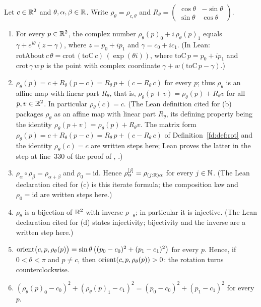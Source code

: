 \begin{lemma}\label{fd:lem:rot}\sloppy
Let $c\in\mathbb R^2$ and $\theta,\alpha,\beta\in\mathbb R$. Write $\rho_\theta=\rho_{c,\theta}$ and
$R_\theta=\begin{pmatrix}\cos\theta&-\sin\theta\\ \sin\theta&\cos\theta\end{pmatrix}$.
\begin{enumerate}[label=(\alph*)]
\item For every $p\in\mathbb R^2$, the complex number $\rho_\theta(p)_0+i\,\rho_\theta(p)_1$ equals
  $\gamma+e^{i\theta}(z-\gamma)$, where $z=p_0+ip_1$ and $\gamma=c_0+ic_1$. (In Lean:
  $\mathrm{rotAbout}\,c\,\theta=\mathrm{crot}\,(\mathrm{toC}\,c)\,(\exp(\theta i))$, where
  $\mathrm{toC}\,p=p_0+ip_1$ and $\mathrm{crot}\,\gamma\,w\,p$ is the point with complex coordinate
  $\gamma+w(\mathrm{toC}\,p-\gamma)$.)
\item $\rho_\theta(p)=c+R_\theta(p-c)=R_\theta\,p+(c-R_\theta\,c)$ for every $p$; thus $\rho_\theta$ is an
  affine map with linear part $R_\theta$, that is, $\rho_\theta(p+v)=\rho_\theta(p)+R_\theta v$ for all
  $p,v\in\mathbb R^2$. In particular $\rho_\theta(c)=c$. (The Lean definition  cited for (b)
  packages $\rho_\theta$ as an affine map with linear part $R_\theta$, its defining property being the
  identity $\rho_\theta(p+v)=\rho_\theta(p)+R_\theta v$. The matrix form
  $\rho_\theta(p)=c+R_\theta(p-c)=R_\theta\,p+(c-R_\theta\,c)$ of Definition~\ref{fd:def:rot} and the
  identity $\rho_\theta(c)=c$ are written steps here; Lean proves the latter in the step at line~330 of the
  proof of , .)
\item $\rho_\alpha\circ\rho_\beta=\rho_{\alpha+\beta}$ and $\rho_0=\mathrm{id}$. Hence
  $\rho_\alpha^{[j]}=\rho_{(j:\mathbb R)\alpha}$ for every $j\in\mathbb N$. (The Lean declaration cited for (c) is this
  iterate formula; the composition law and $\rho_0=\mathrm{id}$ are written steps here.)
\item $\rho_\theta$ is a bijection of $\mathbb R^2$ with inverse $\rho_{-\theta}$; in particular it is
  injective. (The Lean declaration cited for (d) states injectivity; bijectivity and the inverse are a
  written step here.)
\item $\operatorname{orient}\bigl(c,p,\rho_\theta(p)\bigr)=\sin\theta\,\bigl((p_0-c_0)^2+(p_1-c_1)^2\bigr)$ for every
  $p$. Hence, if $0<\theta<\pi$ and $p\ne c$, then $\operatorname{orient}(c,p,\rho_\theta(p))>0$: the rotation turns
  counterclockwise.
\item $(\rho_\theta(p)_0-c_0)^2+(\rho_\theta(p)_1-c_1)^2=(p_0-c_0)^2+(p_1-c_1)^2$ for every $p$.
\end{enumerate}
\end{lemma}

